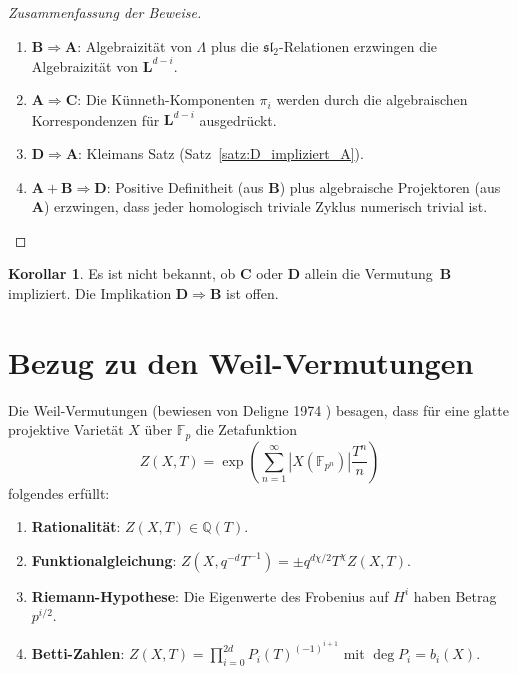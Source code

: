 \documentclass[12pt,a4paper]{amsart}
\theoremstyle{definition}
\newtheorem{korollar}[theorem]{Korollar}
\newcommand{\Q}{\mathbb{Q}}
\newcommand{\Fp}{\mathbb{F}_p}
\begin{document}
\begin{proof}[Zusammenfassung der Beweise]
\begin{enumerate}[label=(\roman*)]
  \item $\mathbf{B} \Rightarrow \mathbf{A}$: Algebraizität von $\Lambda$ plus
        die $\mathfrak{sl}_2$-Relationen erzwingen die Algebraizität von
        $\mathbf{L}^{d-i}$.
  \item $\mathbf{A} \Rightarrow \mathbf{C}$: Die Künneth-Komponenten $\pi_i$
        werden durch die algebraischen Korrespondenzen für $\mathbf{L}^{d-i}$
        ausgedrückt.
  \item $\mathbf{D} \Rightarrow \mathbf{A}$: Kleimans Satz
        (Satz~\ref{satz:D_impliziert_A}).
  \item $\mathbf{A} + \mathbf{B} \Rightarrow \mathbf{D}$: Positive Definitheit
        (aus $\mathbf{B}$) plus algebraische Projektoren (aus $\mathbf{A}$)
        erzwingen, dass jeder homologisch triviale Zyklus numerisch trivial ist.
\end{enumerate}
\end{proof}

\begin{korollar}
Es ist nicht bekannt, ob $\mathbf{C}$ oder $\mathbf{D}$ allein die
Vermutung~$\mathbf{B}$ impliziert.  Die Implikation $\mathbf{D} \Rightarrow \mathbf{B}$
ist offen.
\end{korollar}

\section{Bezug zu den Weil-Vermutungen}\label{sec:weilverw}

Die Weil-Vermutungen (bewiesen von Deligne 1974 \cite{deligne1974}) besagen,
dass für eine glatte projektive Varietät $X$ über $\Fp$ die Zetafunktion
\[
  Z(X, T) = \exp\!\left(\sum_{n=1}^\infty |X(\mathbb{F}_{p^n})| \frac{T^n}{n}\right)
\]
folgendes erfüllt:
\begin{enumerate}[label=(\roman*)]
  \item \textbf{Rationalität}: $Z(X,T) \in \Q(T)$.
  \item \textbf{Funktionalgleichung}: $Z(X, q^{-d}T^{-1}) = \pm q^{d\chi/2} T^\chi Z(X,T)$.
  \item \textbf{Riemann-Hypothese}: Die Eigenwerte des Frobenius auf $H^i$
        haben Betrag $p^{i/2}$.
  \item \textbf{Betti-Zahlen}: $Z(X,T) = \prod_{i=0}^{2d} P_i(T)^{(-1)^{i+1}}$
        mit $\deg P_i = b_i(X)$.
\end{enumerate}
\end{document}
